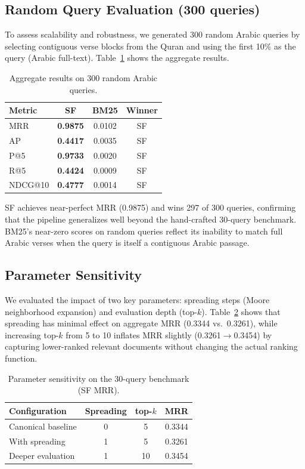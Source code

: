 \documentclass[conference]{IEEEtran}
\begin{document}
\subsection{Random Query Evaluation (300 queries)}

To assess scalability and robustness, we generated 300 random Arabic
queries by selecting contiguous verse blocks from the Quran and using
the first 10\% as the query (Arabic full-text). Table~\ref{tab:random300}
shows the aggregate results.

\begin{table}[t]
  \centering
  \caption{Aggregate results on 300 random Arabic queries.}
  \label{tab:random300}
  \footnotesize
  \begin{tabular}{lccc}
    \toprule
    \textbf{Metric} &
    \textbf{\textcolor{sfblue}{SF}} &
    \textbf{BM25} &
    \textbf{Winner} \\
    \midrule
    MRR   & \textbf{0.9875} & 0.0102 & SF \\
    AP    & \textbf{0.4417} & 0.0035 & SF \\
    P@5   & \textbf{0.9733} & 0.0020 & SF \\
    R@5   & \textbf{0.4424} & 0.0009 & SF \\
    NDCG@10 & \textbf{0.4777} & 0.0014 & SF \\
    \bottomrule
  \end{tabular}
\end{table}

SF achieves near-perfect MRR (0.9875) and wins 297 of 300 queries,
confirming that the pipeline generalizes well beyond the hand-crafted
30-query benchmark. BM25's near-zero scores on random queries reflect
its inability to match full Arabic verses when the query is itself a
contiguous Arabic passage.

\subsection{Parameter Sensitivity}

We evaluated the impact of two key parameters: spreading steps (Moore
neighborhood expansion) and evaluation depth (top-$k$).
Table~\ref{tab:paramsens} shows that spreading has minimal effect on
aggregate MRR (0.3344 vs.\ 0.3261), while increasing top-$k$ from 5 to
10 inflates MRR slightly (0.3261$\to$0.3454) by capturing lower-ranked
relevant documents without changing the actual ranking function.

\begin{table}[t]
  \centering
  \caption{Parameter sensitivity on the 30-query benchmark (SF MRR).}
  \label{tab:paramsens}
  \footnotesize
  \begin{tabular}{lccc}
    \toprule
    \textbf{Configuration} &
    \textbf{Spreading} &
    \textbf{top-$k$} &
    \textbf{MRR} \\
    \midrule
    Canonical baseline & 0 & 5 & 0.3344 \\
    With spreading & 1 & 5 & 0.3261 \\
    Deeper evaluation & 1 & 10 & 0.3454 \\
    \bottomrule
  \end{tabular}
\end{table}
\end{document}
